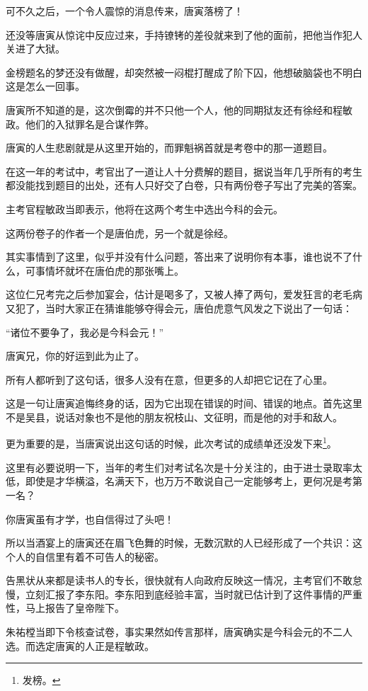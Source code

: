 \begin{multicols}{\theparacolNo}
可不久之后，一个令人震惊的消息传来，唐寅落榜了！

还没等唐寅从惊诧中反应过来，手持镣铐的差役就来到了他的面前，把他当作犯人关进了大狱。

金榜题名的梦还没有做醒，却突然被一闷棍打醒成了阶下囚，他想破脑袋也不明白这是怎么一回事。

唐寅所不知道的是，这次倒霉的并不只他一个人，他的同期狱友还有徐经和程敏政。他们的入狱罪名是合谋作弊。

唐寅的人生悲剧就是从这里开始的，而罪魁祸首就是考卷中的那一道题目。

在这一年的考试中，考官出了一道让人十分费解的题目，据说当年几乎所有的考生都没能找到题目的出处，还有人只好交了白卷，只有两份卷子写出了完美的答案。

主考官程敏政当即表示，他将在这两个考生中选出今科的会元。

这两份卷子的作者一个是唐伯虎，另一个就是徐经。

其实事情到了这里，似乎并没有什么问题，答出来了说明你有本事，谁也说不了什么，可事情坏就坏在唐伯虎的那张嘴上。

这位仁兄考完之后参加宴会，估计是喝多了，又被人捧了两句，爱发狂言的老毛病又犯了，当时大家正在猜谁能够夺得会元，唐伯虎意气风发之下说出了一句话：

“诸位不要争了，我必是今科会元！”

唐寅兄，你的好运到此为止了。

所有人都听到了这句话，很多人没有在意，但更多的人却把它记在了心里。

这是一句让唐寅追悔终身的话，因为它出现在错误的时间、错误的地点。首先这里不是吴县，说话对象也不是他的朋友祝枝山、文征明，而是他的对手和敌人。

更为重要的是，当唐寅说出这句话的时候，此次考试的成绩单还没发下来\footnote{发榜。}。

这里有必要说明一下，当年的考生们对考试名次是十分关注的，由于进士录取率太低，即使是才华横溢，名满天下，也万万不敢说自己一定能够考上，更何况是考第一名？

你唐寅虽有才学，也自信得过了头吧！

所以当酒宴上的唐寅还在眉飞色舞的时候，无数沉默的人已经形成了一个共识：这个人的自信里有着不可告人的秘密。

告黑状从来都是读书人的专长，很快就有人向政府反映这一情况，主考官们不敢怠慢，立刻汇报了李东阳。李东阳到底经验丰富，当时就已估计到了这件事情的严重性，马上报告了皇帝陛下。

朱祐樘当即下令核查试卷，事实果然如传言那样，唐寅确实是今科会元的不二人选。而选定唐寅的人正是程敏政。


\end{multicols}
